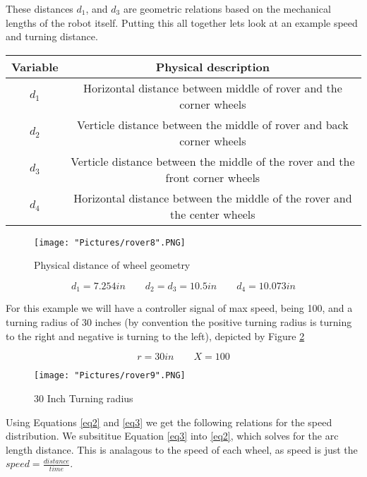 \documentclass[12pt]{article}
\begin{document}
\noindent These distances $d_1$, and $d_3$ are geometric relations based on the mechanical lengths of the robot itself. Putting this all together lets look at an example speed and turning distance. 
\begin{centering}
\begin{tabular}[2]{|c|c|}
	\hline
	\textbf{Variable} & \textbf{Physical description} \\ \hline
	$d_1$ & Horizontal distance between middle of rover and the corner wheels \\ \hline
	$d_2$ & Verticle distance between the middle of rover and back corner wheels \\ \hline
	$d_3$ & Verticle distance between the middle of the rover and the front corner wheels \\ \hline
	$d_4$ & Horizontal distance between the middle of the rover and the center wheels \\ \hline
\end{tabular}

\begin{figure}[H]
 	\centering
	\texttt{[image: "Pictures/rover8".PNG]}
 	\caption{Physical distance of wheel geometry}
	\label{r5}
\end{figure}

\end{centering}
\begin{equation}
	d_1 = 7.254 in \qquad d_2 = d_3 = 10.5 in \qquad d_4 = 10.073 in
\end{equation}

\noindent For this example we will have a controller signal of max speed, being 100, and a turning radius of 30 inches (by convention the positive turning radius is turning to the right and negative is turning to the left), depicted by Figure \ref{r6}

\begin{equation}
	r = 30 in \qquad X = 100 
\end{equation}

\begin{figure}[H]
 	\centering
	\texttt{[image: "Pictures/rover9".PNG]}
 	\caption{30 Inch Turning radius}
	\label{r6}
\end{figure}


\noindent Using Equations \ref{eq2} and  \ref{eq3} we get the following relations for the speed distribution. We subsititue Equation \ref{eq3} into \ref{eq2}, which solves for the arc length distance. This is analagous to the speed of each wheel, as speed is just the $speed = \frac{distance}{time}$. 
\end{document}
